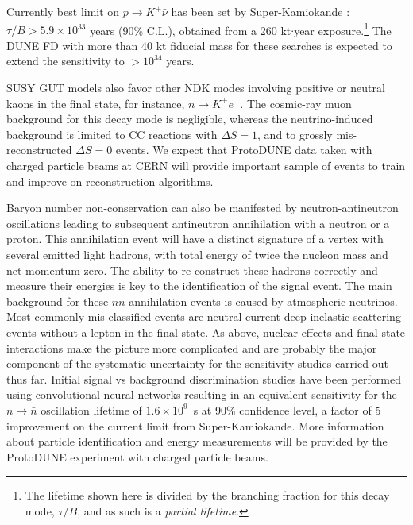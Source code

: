Currently best limit on $p\to K^+ \bar{\nu}$ has been set by Super-Kamiokande \cite{Abe:2014mwa}: $\tau/B > 5.9\times10^{33}$ years (90\% C.L.), obtained from a 260 kt$\cdot$year exposure.\footnote{The lifetime shown here is divided by the branching fraction for this decay mode, $\tau/B$, and
 as such is a \emph{partial lifetime}.} The DUNE FD with more than 40 kt fiducial mass for these searches is expected to extend the sensitivity to $>10^{34}$ years. 

SUSY GUT models also favor other NDK modes involving positive or neutral kaons in the final state, for instance, $n\to K^+ e^-$. The cosmic-ray muon background for this decay mode is negligible, whereas the neutrino-induced background is limited to CC reactions with $\Delta S = 1$, and to grossly mis-reconstructed $\Delta S = 0$ events. 
We expect that ProtoDUNE data taken with charged particle beams at CERN will provide important sample of events to train and improve on reconstruction algorithms. 


Baryon number non-conservation can also be manifested by neutron-antineutron oscillations leading to subsequent antineutron annihilation with a neutron or a proton. This annihilation event will have a distinct signature of a vertex with several emitted light hadrons, with total energy of twice the nucleon mass and net momentum zero. The ability to re-construct these hadrons correctly and measure their energies is key to the identification of the signal event. The main background for these $n\bar n$ annihilation events is caused by atmospheric neutrinos. Most commonly mis-classified events are neutral current deep inelastic scattering events without a lepton in the final state. As above, nuclear effects and final state interactions make the picture more complicated and are probably the major component of the systematic uncertainty for the sensitivity studies carried out thus far.  Initial signal vs background discrimination studies have been performed using convolutional neural networks resulting in an equivalent sensitivity for the $n\rightarrow \bar n$ oscillation lifetime of $1.6 \times 10^9$~s at 90\% confidence level, a factor of 5 improvement on the current limit from Super-Kamiokande.
More information about particle identification and energy measurements will be provided by the ProtoDUNE experiment with charged particle beams. 

